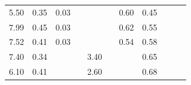 \begin{refsection}[referencesCh3]
\begin{table}
\begin{adjustbox}{scale=0.8,center}
\begin{tabular}{@{}ccccccccccc@{}}
		5.50                                                         & 0.35                                                & 0.03                                                &                                                     &                                                     &                                                      & 0.60                                                & 0.45                                                  &                                                         &                                                      & \cite{ADAS}            \\
		7.99                                                         & 0.45                                                & 0.03                                                &                                                     &                                                     &                                                      & 0.62                                                & 0.55                                                  &                                                         &                                                      & \cite{ADAS}            \\
		7.52                                                         & 0.41                                                & 0.03                                                &                                                     &                                                     &                                                      & 0.54                                                & 0.58                                                  &                                                         &                                                      & \cite{ADAS}            \\
		7.40                                                         & 0.34                                                &                                                     &                                                     & 3.40                                                &                                                      &                                                     & 0.65                                                  &                                                         &                                                      & \cite{Risgberg}                               \\
		6.10                                                         & 0.41                                                &                                                     &                                                     & 2.60                                                &                                                      &                                                     & 0.68                                                  &                                                         &                                                      & \cite{Risgberg}                                \\

\end{tabular}
\end{adjustbox}
\end{table}
\end{refsection}
